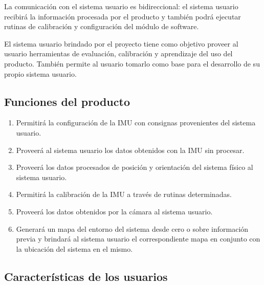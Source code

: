 \documentclass[12pt,a4paper, twosite]{article}
\begin{document}
La comunicación con el sistema usuario es bidireccional: el sistema usuario recibirá la información
procesada por el producto y también podrá ejecutar rutinas de calibración y configuración del
módulo de software.

El sistema usuario brindado por el proyecto tiene como objetivo proveer al usuario herramientas de
evaluación, calibración y aprendizaje del uso del producto. También permite al usuario tomarlo
como base para el desarrollo de su propio sistema usuario.

\subsection{Funciones del producto}
\label{sec:orgaf51da6}



\begin{enumerate}
  \item Permitirá la configuración de la IMU con consignas provenientes del sistema usuario.
  \item Proveerá al sistema usuario los datos obtenidos con la IMU sin procesar.
  \item Proveerá los datos procesados de posición y orientación del sistema físico al sistema
  usuario.
  \item Permitirá la calibración de la IMU a través de rutinas determinadas. 
  \item Proveerá los datos obtenidos por la cámara al sistema usuario.
  \item Generará un mapa del entorno del sistema desde cero o sobre información previa y brindará
  al sistema usuario el correspondiente mapa en conjunto con la ubicación del sistema en el mismo.
\end{enumerate}

\subsection{Características de los usuarios}
\label{sec:orga40b0ee}
\end{document}
